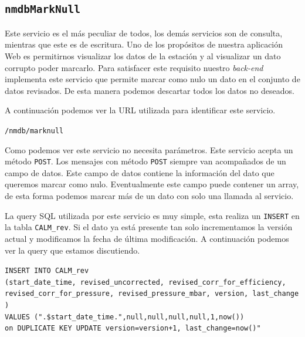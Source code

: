 {	\subsection{\texttt{nmdbMarkNull}}
		Este servicio es el más peculiar de todos, los demás servicios son de consulta, mientras que este es de escritura. Uno de los
		propósitos de nuestra aplicación Web es permitirnos visualizar los datos de la estación y al visualizar un dato corrupto poder
		marcarlo. Para satisfacer este requisito nuestro \emph{back-end} implementa este servicio que permite marcar como nulo un dato en el
		conjunto de datos revisados. De esta manera podemos descartar todos los datos no deseados.
		\par
		A continuación podemos ver la URL utilizada para identificar este servicio.
			\begin{center} \texttt{/nmdb/marknull}  \end{center}
		Como podemos ver este servicio no necesita parámetros. Este servicio acepta un método \texttt{POST}. Los mensajes con método
		\texttt{POST} siempre van acompañados de un campo de datos. Este campo de datos contiene la información del dato que queremos marcar
		como nulo. Eventualmente este campo puede contener un array, de esta forma podemos marcar más de un dato con solo una llamada al
		servicio.
		\par 
		La query SQL utilizada por este servicio es muy simple, esta realiza un \texttt{INSERT} en la tabla \texttt{CALM\_rev}. Si el dato ya
		está presente tan solo incrementamos la versión actual y modificamos la fecha de última modificación. A continuación podemos ver la
		query que estamos discutiendo.
			\begin{center} \texttt{\textquotedbl INSERT INTO CALM\_rev 
			  		\\	(start\_date\_time, revised\_uncorrected, revised\_corr\_for\_efficiency, revised\_corr\_for\_pressure, revised\_pressure\_mbar, version, last\_change )
				      	\\	VALUES (\cc".\$start\_date\_time."\cc,null,null,null,null,1,now()) 
				      	\\	on DUPLICATE KEY UPDATE version=version+1, last\_change=now()"}
			\end{center} 
}
